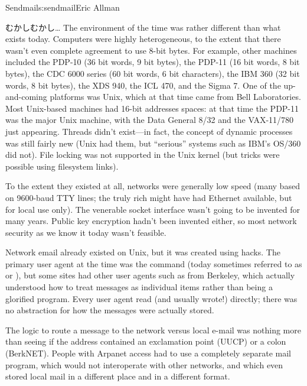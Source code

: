 \begin{aosachapter}{Sendmail}{s:sendmail}{Eric Allman}
\begin{aosasect1}{むかしむかし\ldots}
The environment of the time was rather different than what exists
today.  Computers were highly heterogeneous, to the extent that there
wasn't even complete agreement to use 8-bit bytes.
For example, other machines included the PDP-10 (36 bit words, 9 bit bytes),
the PDP-11 (16 bit words, 8 bit bytes),
the CDC 6000 series (60 bit words, 6 bit characters),
the IBM 360 (32 bit words, 8 bit bytes),
the XDS 940, the ICL 470, and the Sigma 7.
One of the up-and-coming platforms was Unix,
which at that time came from Bell Laboratories.
Most Unix-based
machines had 16-bit addresses spaces: at that time the PDP-11 was the
major Unix machine, with the Data General 8/32 and the VAX-11/780 just
appearing.  Threads didn't exist---in fact, the concept of dynamic
processes was still fairly new (Unix had them, but ``serious'' systems
such as IBM's OS/360 did not). File locking was not supported in the
Unix kernel (but tricks were possible using filesystem links).

To the extent they existed at all, networks were generally low speed
(many based on 9600-baud TTY lines; the truly rich might have had
Ethernet available, but for local use only). The venerable socket
interface wasn't going to be invented for many years. Public key
encryption hadn't been invented either, so most network security as we
know it today wasn't feasible.

Network email already existed on Unix, but it was created using
hacks.  The primary user agent at the time was the 
command (today sometimes referred to as  or
), but some sites had other user agents such as
 from Berkeley, which actually understood how to
treat messages as individual items rather than being a glorified
 program.  Every user agent read (and usually wrote!)
 directly; there was no abstraction for how the
messages were actually stored.

The logic to route a message to the network versus local e-mail was nothing
more than seeing if the address contained an exclamation point (UUCP)
or a colon (BerkNET). People with Arpanet access had to use a
completely separate mail program, which would not interoperate with
other networks, and which even stored local mail in a different place
and in a different format.


\end{aosasect1}
\end{aosachapter}
